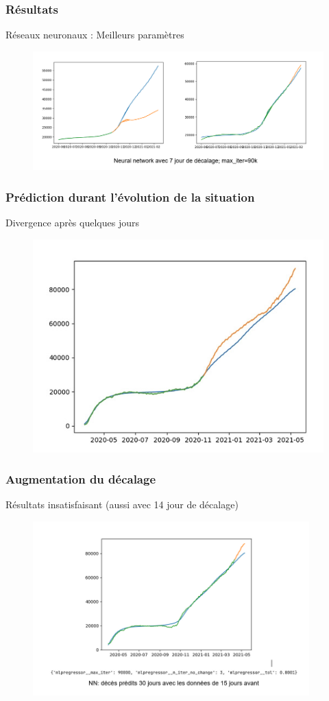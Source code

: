 \documentclass{beamer}
\begin{document}
\begin{frame}
	\frametitle{Résultats}
	Réseaux neuronaux : Meilleurs paramètres
	\begin{figure}
		\includegraphics[scale=0.6]{NN_3}
	\end{figure}
\end{frame}

\begin{frame}
	\frametitle{Prédiction durant l'évolution de la situation}
	Divergence après quelques jours
	\begin{figure}[h]
		\centering
		\includegraphics[width=\textwidth]{NN_1}
	\end{figure}
\end{frame}

\begin{frame}
	\frametitle{Augmentation du décalage}
	Résultats insatisfaisant (aussi avec 14 jour de décalage)
	\begin{figure}
		\includegraphics[width=0.95\textwidth]{NN_2}
	\end{figure}
\end{frame}
\end{document}
